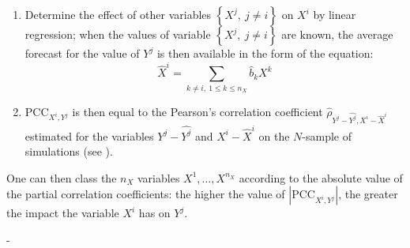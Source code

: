 {\begin{enumerate}
  \item Determine the effect of other variables $\left\{ X^j,\ j\neq i \right\}$ on $X^i$ by linear regression; when the values of variable $\left\{ X^j,\ j\neq i \right\}$ are known, the average forecast for the value of $Y^j$ is then available in the form of the equation:
    $$\widehat{X}^i = \sum_{k \neq i,\ 1 \leq k \leq n_X} \widehat{b}_k X^k $$

  \item $\textrm{PCC}_{X^i,Y^j}$ is then equal to the Pearson's correlation coefficient $\widehat{\rho}_{Y^j-\widehat{Y^j},X^i-\widehat{X}^i}$  estimated for the variables  $Y^j-\widehat{Y^j}$ and $X^i-\widehat{X}^i$ on the $N$-sample of simulations (see ).
  \end{enumerate}

  One can then class the $n_X$ variables $X^1,\ldots, X^{n_X}$ according to the absolute value of the partial correlation coefficients: the higher the value of $\left| \textrm{PCC}_{X^i,Y^j} \right|$, the greater the impact the variable $X^i$ has on $Y^j$.

}
{
  -
}

